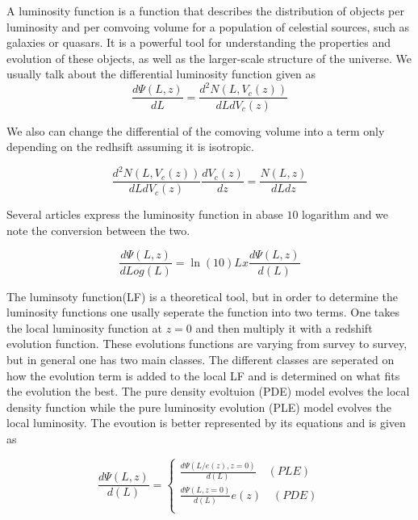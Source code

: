\documentclass{article}
\begin{document}
A luminosity function is a function that describes the distribution of objects per luminosity and per comvoing volume for a population of celestial sources,
such as galaxies or quasars. It is a powerful tool for understanding the properties and evolution of 
these objects, as well as the larger-scale structure of the universe. 
 We usually talk about the differential luminosity function given as
\begin{equation}
    \frac{d\Psi(L,z)}{dL} = \frac{d^2N(L,V_c(z))}{dLdV_c(z)}
\end{equation}

We also can change the differential of the comoving volume into a term only depending on the redhsift assuming it is isotropic.

\begin{equation}
    \frac{d^2N(L,V_c(z))}{dLdV_c(z)}\frac{dV_c(z)}{dz} = \frac{N(L,z)}{dLdz}
\end{equation}


Several articles express the luminosity function in abase $10$ logarithm and we note the conversion between the two. 

\begin{equation}
    \frac{d\Psi(L,z)}{dLog(L)} =  \ln (10)  Lx \frac{d\Psi(L,z)}{d(L)}
\end{equation}


The luminsoty function(LF) is a theoretical tool, but in order to determine the luminosity functions one usally seperate the function into two terms. 
One takes the local luminosity function at $z=0$ and then multiply it with a redshift evolution function. These evolutions functions
are varying from survey to survey, but in general one has two main classes. 
The different classes are seperated on how the evolution term is added to the local LF and is determined on what fits the evolution the best. 
The pure density evoltuion (PDE) model evolves the local density function while the pure luminosity evolution (PLE) model evolves the local luminosity.
The evoution is better represented by its equations and is given as 

\begin{equation}\frac{d\Psi(L,z)}{d(L)} = 
    \begin{cases}
        \frac{d\Psi(L/e(z),z=0)}{d(L)} \quad (PLE)\\
        \frac{d\Psi(L,z=0)}{d(L)}e(z) \quad (PDE)\\
    \end{cases}
\end{equation}
\end{document}
